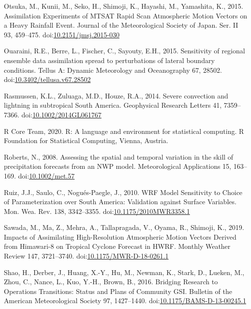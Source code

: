 \documentclass[final,5p,times,twocolumn,authoryear]{elsarticle} %
\begin{document}
\leavevmode\hypertarget{ref-otsuka2015}{}%
Otsuka, M., Kunii, M., Seko, H., Shimoji, K., Hayashi, M., Yamashita, K., 2015. Assimilation Experiments of MTSAT Rapid Scan Atmospheric Motion Vectors on a Heavy Rainfall Event. Journal of the Meteorological Society of Japan. Ser. II 93, 459--475. doi:\href{https://doi.org/10.2151/jmsj.2015-030}{10.2151/jmsj.2015-030}

\leavevmode\hypertarget{ref-ouaraini2015}{}%
Ouaraini, R.E., Berre, L., Fischer, C., Sayouty, E.H., 2015. Sensitivity of regional ensemble data assimilation spread to perturbations of lateral boundary conditions. Tellus A: Dynamic Meteorology and Oceanography 67, 28502. doi:\href{https://doi.org/10.3402/tellusa.v67.28502}{10.3402/tellusa.v67.28502}

\leavevmode\hypertarget{ref-rasmussen2014}{}%
Rasmussen, K.L., Zuluaga, M.D., Houze, R.A., 2014. Severe convection and lightning in subtropical South America. Geophysical Research Letters 41, 7359--7366. doi:\href{https://doi.org/10.1002/2014GL061767}{10.1002/2014GL061767}

\leavevmode\hypertarget{ref-rcoreteam2020}{}%
R Core Team, 2020. R: A language and environment for statistical computing. R Foundation for Statistical Computing, Vienna, Austria.

\leavevmode\hypertarget{ref-roberts2008}{}%
Roberts, N., 2008. Assessing the spatial and temporal variation in the skill of precipitation forecasts from an NWP model. Meteorological Applications 15, 163--169. doi:\href{https://doi.org/10.1002/met.57}{10.1002/met.57}

\leavevmode\hypertarget{ref-ruiz2010}{}%
Ruiz, J.J., Saulo, C., Nogués-Paegle, J., 2010. WRF Model Sensitivity to Choice of Parameterization over South America: Validation against Surface Variables. Mon. Wea. Rev. 138, 3342--3355. doi:\href{https://doi.org/10.1175/2010MWR3358.1}{10.1175/2010MWR3358.1}

\leavevmode\hypertarget{ref-sawada2019}{}%
Sawada, M., Ma, Z., Mehra, A., Tallapragada, V., Oyama, R., Shimoji, K., 2019. Impacts of Assimilating High-Resolution Atmospheric Motion Vectors Derived from Himawari-8 on Tropical Cyclone Forecast in HWRF. Monthly Weather Review 147, 3721--3740. doi:\href{https://doi.org/10.1175/MWR-D-18-0261.1}{10.1175/MWR-D-18-0261.1}

\leavevmode\hypertarget{ref-shao2016}{}%
Shao, H., Derber, J., Huang, X.-Y., Hu, M., Newman, K., Stark, D., Lueken, M., Zhou, C., Nance, L., Kuo, Y.-H., Brown, B., 2016. Bridging Research to Operations Transitions: Status and Plans of Community GSI. Bulletin of the American Meteorological Society 97, 1427--1440. doi:\href{https://doi.org/10.1175/BAMS-D-13-00245.1}{10.1175/BAMS-D-13-00245.1}
\end{document}
